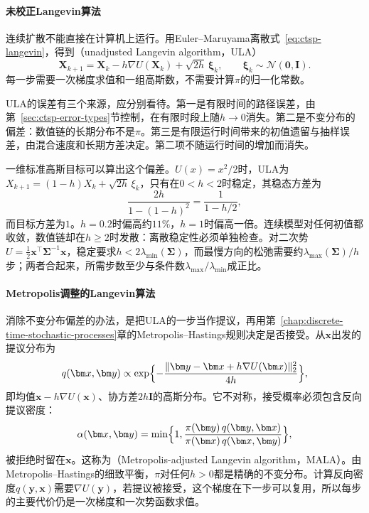 \paragraph{未校正Langevin算法}
连续扩散不能直接在计算机上运行。用Euler--Maruyama离散式~\eqref{eq:ctsp-langevin}，得到（unadjusted Langevin algorithm，ULA）
\begin{equation}
  \bm X_{k+1}=\bm X_k-h\nabla U(\bm X_k)+\sqrt{2h}\,\bm\xi_k,\qquad\bm\xi_k\sim\mathcal N(\bm0,\bm I).
  \label{eq:ctsp-ula}
\end{equation}
每一步需要一次梯度求值和一组高斯数，不需要计算$\pi$的归一化常数。

ULA的误差有三个来源，应分别看待。第一是有限时间的路径误差，由第~\ref{sec:ctsp-error-types}节控制，在有限时段上随$h\to0$消失。第二是不变分布的偏差：数值链的长期分布不是$\pi$。第三是有限运行时间带来的初值遗留与抽样误差，由混合速度和长期方差决定。第二项不随运行时间的增加而消失。

一维标准高斯目标可以算出这个偏差。$U(x)=x^2/2$时，ULA为$X_{k+1}=(1-h)X_k+\sqrt{2h}\,\xi_k$，只有在$0<h<2$时稳定，其稳态方差为
\[
  \frac{2h}{1-(1-h)^2}=\frac1{1-h/2},
\]
而目标方差为$1$。$h=0.2$时偏高约$11\%$，$h=1$时偏高一倍。连续模型对任何初值都收敛，数值链却在$h\geq2$时发散：离散稳定性必须单独检查。对二次势$U=\frac12\bm x^\top\bm\Sigma^{-1}\bm x$，稳定要求$h<2\lambda_{\min}(\bm\Sigma)$，而最慢方向的松弛需要约$\lambda_{\max}(\bm\Sigma)/h$步；两者合起来，所需步数至少与条件数$\lambda_{\max}/\lambda_{\min}$成正比。

\paragraph{Metropolis调整的Langevin算法}
消除不变分布偏差的办法，是把ULA的一步当作提议，再用第~\ref{chap:discrete-time-stochastic-processes}章的Metropolis--Hastings规则决定是否接受。从$\bm x$出发的提议分布为
\[
  q(\bm x,\bm y)\propto\exp\Bigl\{-\frac{\|\bm y-\bm x+h\nabla U(\bm x)\|_2^2}{4h}\Bigr\},
\]
即均值$\bm x-h\nabla U(\bm x)$、协方差$2h\bm I$的高斯分布。它不对称，接受概率必须包含反向提议密度：
\begin{equation}
  \alpha(\bm x,\bm y)=\min\Bigl\{1,\frac{\pi(\bm y)\,q(\bm y,\bm x)}{\pi(\bm x)\,q(\bm x,\bm y)}\Bigr\},
  \label{eq:ctsp-mala}
\end{equation}
被拒绝时留在$\bm x$。这称为（Metropolis-adjusted Langevin algorithm，MALA）。由Metropolis--Hastings的细致平衡，$\pi$对任何$h>0$都是精确的不变分布。计算反向密度$q(\bm y,\bm x)$需要$\nabla U(\bm y)$，若提议被接受，这个梯度在下一步可以复用，所以每步的主要代价仍是一次梯度和一次势函数求值。

